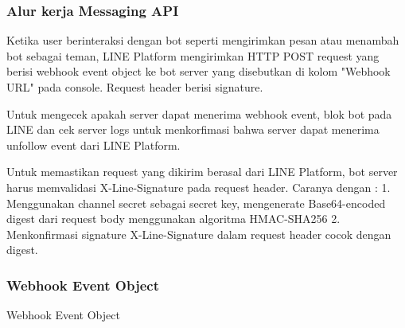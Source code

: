 \subsubsection{Alur kerja Messaging API}
Ketika user berinteraksi dengan bot seperti mengirimkan pesan atau menambah bot sebagai teman, LINE Platform mengirimkan HTTP POST request yang berisi webhook event object ke bot server yang disebutkan di kolom "Webhook URL" pada console. Request header berisi signature. 

Untuk mengecek apakah server dapat menerima webhook event, blok bot pada LINE dan cek server logs untuk menkorfimasi bahwa server dapat menerima unfollow event dari LINE Platform.


Untuk memastikan request yang dikirim berasal dari LINE Platform, bot server harus memvalidasi X-Line-Signature pada request header. Caranya dengan :
1. Menggunakan channel secret sebagai secret key, mengenerate Base64-encoded digest dari request body menggunakan algoritma HMAC-SHA256
2. Menkonfirmasi signature X-Line-Signature dalam request header cocok dengan digest.


\subsubsection{Webhook Event Object}
Webhook Event Object

